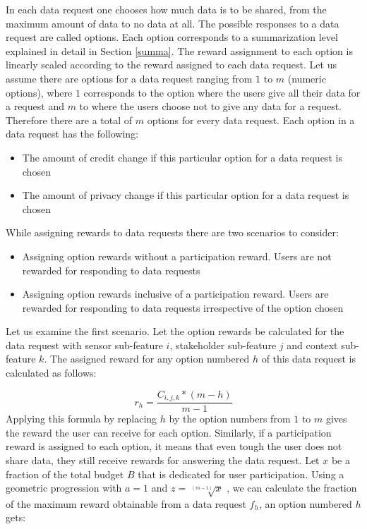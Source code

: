 In each data request one chooses how much data is to be shared, from the maximum amount of data to no data at all. The possible responses to a data request are called options. Each option corresponds to a summarization level explained in detail in Section \ref{summa}. The reward assignment to each option is linearly scaled according
to the reward assigned to each data request. Let us assume there are options for a data request ranging from $1$ to $m$ (numeric options), where $1$ corresponds to the option where the users give all their data for a request and $m$ to where the users choose not to give any data for a request. Therefore there are a total of $m$ options for every data request. Each option in a data request has the following:

\begin{itemize}
\item The amount of credit change if this particular option for a data request is chosen
\item The amount of privacy change if this particular option for a data request is chosen
\end{itemize}

While assigning rewards to data requests there are two scenarios to consider:

\begin{itemize}
\item Assigning option rewards without a participation reward. Users are not rewarded for responding to data requests
\item Assigning option rewards inclusive of a participation reward. Users are rewarded for responding to data requests irrespective of the option chosen
\end{itemize}

Let us examine the first scenario. Let the option rewards be calculated for the data request with sensor sub-feature $i$, stakeholder sub-feature $j$ and
context sub-feature $k$. The assigned reward for any option numbered $h$ of this data request is calculated as follows:

\begin{equation}
r_{h} =  \frac{C_{i,j,k}*(m-h)}{m-1}
\end{equation}
Applying this formula by replacing $h$ by the option numbers from $1$ to $m$ gives the reward the user can receive for each option.
Similarly, if a participation reward is assigned to each option, it means that even tough the user does not share data, they still
receive rewards for answering the data request. Let $x$ be a fraction of the total budget $B$ that is dedicated for user participation. Using a geometric progression with $a=1$ and $z=\sqrt[(m-1)]{x}$ , we can calculate the fraction of the maximum reward obtainable from a data request $f_{h}$, an option numbered $h$ gets:

